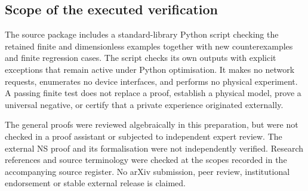 \subsection{Scope of the executed verification}
The source package includes a standard-library Python script checking the retained finite and dimensionless examples together with new counterexamples and finite regression cases. The script checks its own outputs with explicit exceptions that remain active under Python optimisation. It makes no network requests, enumerates no device interfaces, and performs no physical experiment. A passing finite test does not replace a proof, establish a physical model, prove a universal negative, or certify that a private experience originated externally.

The general proofs were reviewed algebraically in this preparation, but were not checked in a proof assistant or subjected to independent expert review. The external NS proof and its formalisation were not independently verified. Research references and source terminology were checked at the scopes recorded in the accompanying source register. No arXiv submission, peer review, institutional endorsement or stable external release is claimed.
